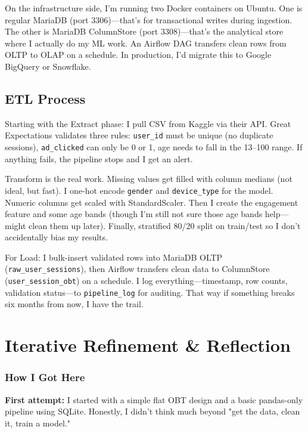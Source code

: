 \documentclass[11pt,a4paper]{article}
\begin{document}
On the infrastructure side, I'm running two Docker containers on Ubuntu. One is regular 
MariaDB (port 3306)—that's for transactional writes during ingestion. The other is MariaDB 
ColumnStore (port 3308)—that's the analytical store where I actually do my ML work. An Airflow 
DAG transfers clean rows from OLTP to OLAP on a schedule. In production, I'd migrate this to 
Google BigQuery or Snowflake.

\subsection{ETL Process}

Starting with the Extract phase: I pull CSV from Kaggle via their API. Great Expectations 
validates three rules: \texttt{user\_id} must be unique (no duplicate sessions), \texttt{ad\_clicked} 
can only be 0 or 1, age needs to fall in the 13--100 range. If anything fails, the pipeline 
stops and I get an alert.

Transform is the real work. Missing values get filled with column medians (not ideal, but 
fast). I one-hot encode \texttt{gender} and \texttt{device\_type} for the model. Numeric 
columns get scaled with StandardScaler. Then I create the engagement feature and some age 
bands (though I'm still not sure those age bands help—might clean them up later). Finally, 
stratified 80/20 split on train/test so I don't accidentally bias my results.

For Load: I bulk-insert validated rows into MariaDB OLTP (\texttt{raw\_user\_sessions}), then 
Airflow transfers clean data to ColumnStore (\texttt{user\_session\_obt}) on a schedule. I log 
everything—timestamp, row counts, validation status—to \texttt{pipeline\_log} for auditing. That 
way if something breaks six months from now, I have the trail.

\section{Iterative Refinement \& Reflection}

\subsubsection*{How I Got Here}

\textbf{First attempt:} I started with a simple flat OBT design and a basic pandas-only pipeline 
using SQLite. Honestly, I didn't think much beyond "get the data, clean it, train a model."
\end{document}
